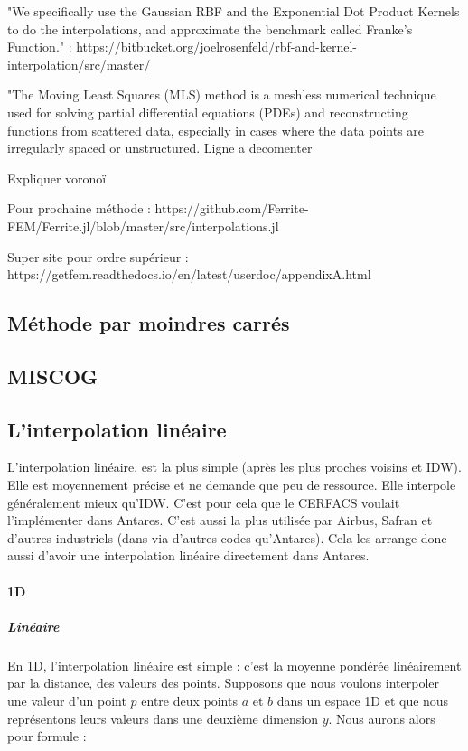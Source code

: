 "We specifically use the Gaussian RBF and the Exponential Dot Product Kernels to do the interpolations, and approximate the benchmark called Franke's Function." : https://bitbucket.org/joelrosenfeld/rbf-and-kernel-interpolation/src/master/

"The Moving Least Squares (MLS) method is a meshless numerical technique used for solving partial differential equations (PDEs) and reconstructing functions from scattered data, especially in cases where the data points are irregularly spaced or unstructured.
Ligne a decomenter%


Expliquer voronoï

Pour prochaine méthode :
https://github.com/Ferrite-FEM/Ferrite.jl/blob/master/src/interpolations.jl


Super site pour ordre supérieur : https://getfem.readthedocs.io/en/latest/userdoc/appendixA.html

\subsection{Méthode par moindres carrés}
\subsection{MISCOG}

\subsection{L'interpolation linéaire}
L'interpolation linéaire, est la plus simple (après les plus proches voisins et IDW). Elle est moyennement précise et ne demande que peu de ressource. Elle interpole généralement mieux qu'IDW. C'est pour cela que le CERFACS voulait l'implémenter dans Antares. C'est aussi la plus utilisée par Airbus, Safran et d'autres industriels (dans via d'autres codes qu'Antares). Cela les arrange donc aussi d'avoir une interpolation linéaire directement dans Antares.


\paragraph{1D}
\subparagraph{Linéaire}

En 1D, l'interpolation linéaire est simple : c'est la moyenne pondérée linéairement par la distance, des valeurs des points.
Supposons que nous voulons interpoler une valeur d'un point \( p \) entre deux points \( a \) et \( b \) dans un espace 1D
et que nous représentons leurs valeurs dans une deuxième dimension \( y \).
Nous aurons alors pour formule :

